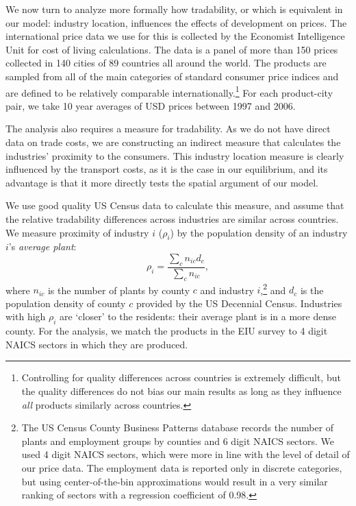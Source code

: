 \documentclass[12pt]{article}
\begin{document}
We now turn to analyze more formally how tradability, or which is equivalent in our model: industry location, influences the effects of development on prices. The international price data we use for this is collected by the Economist Intelligence Unit for cost of living calculations. The data is a panel of more than 150 prices collected in 140 cities of 89 countries all around the world. The products are sampled from all of the main categories of standard consumer price indices and are defined to be relatively comparable internationally.\footnote{Controlling for quality differences across countries is extremely difficult, but the quality differences do not bias our main results as long as they influence \emph{all} products similarly across countries.} For each product-city pair, we take 10 year averages of USD prices between 1997 and 2006.

The analysis also requires a measure for tradability. As we do not have direct data on trade costs, we are constructing an indirect measure that calculates the industries' proximity to the consumers. This industry location measure is clearly influenced by the transport costs, as it is the case in our equilibrium, and its advantage is that it more directly tests the spatial argument of our model.

We use good quality US Census data to calculate this measure, and assume that the relative tradability differences across industries are similar across countries. We measure proximity of industry $i$ ($\rho_i$) by the population density of an industry $i$'s \emph{average plant}:
\begin{equation*}
\rho_i=\frac{\sum_cn_{ic}d_c}{\sum_cn_{ic}},
\end{equation*}
where $n_{ic}$ is the number of plants by county $c$ and industry $i$,\footnote{The US Census County Business Patterns database records the number of plants and employment groups by counties and 6 digit NAICS sectors. We used 4 digit NAICS sectors, which were more in line with the level of detail of our price data. The employment data is reported only in discrete categories, but using center-of-the-bin approximations would result in a very similar ranking of sectors with a regression coefficient of 0.98.} and $d_c$ is the population density of county $c$ provided by the US Decennial Census. Industries with high $\rho_i$ are `closer' to the residents: their average plant is in a more dense county. For the analysis, we match the products in the EIU survey to 4 digit NAICS sectors in which they are produced.
\end{document}
